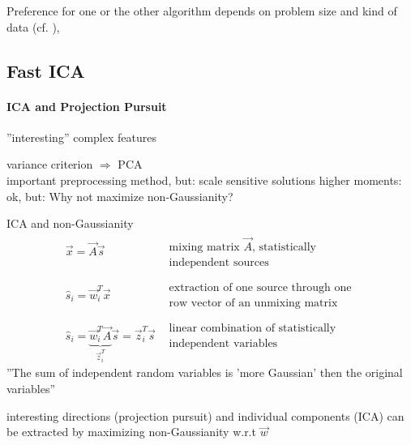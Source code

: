 Preference for one or the other algorithm depends on problem size and kind of data (cf. \cite{StetterEtAl2000}), 


\subsection{Fast ICA}

\paragraph{ICA and Projection Pursuit}
''interesting'' complex features
\begin{itemize}
	\itl variance criterion $\Rightarrow$ PCA \\
		important preprocessing method, but: scale sensitive solutions
	\itl higher moments: ok, but: Why not maximize non-Gaussianity?
\end{itemize}
ICA and non-Gaussianity
\[ \begin{array}{lc}
	\vec{x} = \vec{A} \vec{s} 
	& \substack{ 	\text{mixing matrix } \vec{A} \text{, statistically} \\
		\text{independent sources}} \\\\
	\widehat{s}_i = \vec{w}_i^T \vec{x}
	& \substack{ 	\text{extraction of one source through one} \\
			\text{row vector of an unmixing matrix}} \\\\
	\widehat{s}_i = \underbrace{ \vec{w}_i^T \vec{A} }_{ \vec{z}_i^T }
		\vec{s} = \vec{z}_i^T \vec{s}
	& \substack{ 	\text{linear combination of statistically} \\
			\text{independent variables}}
\end{array} \]
''The sum of independent random variables is 'more Gaussian' then the original variables''
\begin{itemize}
	\itR interesting directions (projection pursuit) and individual 
		components (ICA) can be extracted by maximizing non-Gaussianity
		w.r.t $\vec{w}$
\end{itemize}

